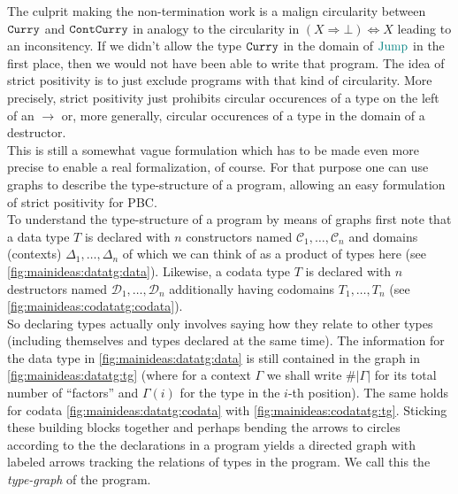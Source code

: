 The culprit making the non-termination work is a malign circularity between $\Curry$ and $\ContCurry$ in analogy to the circularity in $(X \Rightarrow \bot) \Leftrightarrow X$ leading to an inconsitency.
If we didn't allow the type $\Curry$ in the domain of $\Jump$ in the first place, then we would not have been able to write that program.
The idea of strict positivity is to just exclude programs with that kind of circularity.
More precisely, strict positivity just prohibits circular occurences of a type on the left of an $\rightarrow$ or, more generally, circular occurences of a type in the domain of a destructor.
\\
This is still a somewhat vague formulation which has to be made even more precise to enable a real formalization, of course.
For that purpose one can use graphs to describe the type-structure of a program, allowing an easy formulation of strict positivity for PBC.
\\
To understand the type-structure of a program by means of graphs first note that a data type $T$ is declared with $n$ constructors named $\mathcal{C}_{1},\ldots,\mathcal{C}_{n}$ and domains (contexts) $\Delta_{1},\ldots,\Delta_{n}$ of which we can think of as a product of types here (see \cref{fig:mainideas:datatg:data}).
Likewise, a codata type $T$ is declared with $n$ destructors named $\mathcal{D}_{1},\ldots,\mathcal{D}_{n}$ additionally having codomains $T_{1},\ldots,T_{n}$ (see \cref{fig:mainideas:codatatg:codata}).
\\
So declaring types actually only involves saying how they relate to other types (including themselves and types declared at the same time).
The information for the data type in \cref{fig:mainideas:datatg:data} is still contained in the graph in \cref{fig:mainideas:datatg:tg} (where for a context $\Gamma$ we shall write $\#\vert \Gamma \vert$ for its total number of \enquote{factors} and $\Gamma(i)$ for the type in the $i$-th position).
The same holds for codata \cref{fig:mainideas:datatg:codata} with \cref{fig:mainideas:codatatg:tg}.
Sticking these building blocks together and perhaps bending the arrows to circles according to the the declarations in a program yields a directed graph with labeled arrows tracking the relations of types in the program.
We call this the \textit{type-graph} of the program.

